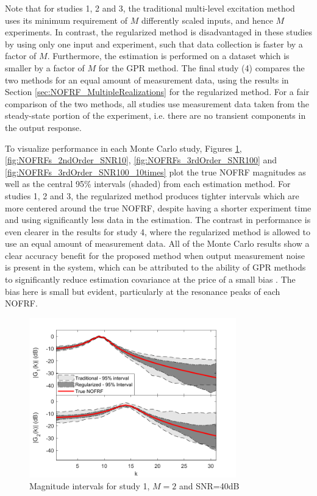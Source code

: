Note that for studies 1, 2 and 3, the traditional multi-level excitation method uses its minimum requirement of $M$ differently scaled inputs, and hence $M$ experiments. In contrast, the regularized method is disadvantaged in these studies by using only one input and experiment, such that data collection is faster by a factor of $M$. Furthermore, the estimation is performed on a dataset which is smaller by a factor of $M$ for the GPR method. The final study (4) compares the two methods for an equal amount of measurement data, using the results in Section \ref{sec:NOFRF_MultipleRealizations} for the regularized method. For a fair comparison of the two methods, all studies use measurement data taken from the steady-state portion of the experiment, i.e. there are no transient components in the output response. 

To visualize performance in each Monte Carlo study, Figures \ref{fig:NOFRFs_2ndOrder_SNR100}, \ref{fig:NOFRFs_2ndOrder_SNR10}, \ref{fig:NOFRFs_3rdOrder_SNR100} and \ref{fig:NOFRFs_3rdOrder_SNR100_10times} plot the true NOFRF magnitudes as well as the central 95\% intervals (shaded) from each estimation method. For studies 1, 2 and 3, the regularized method produces tighter intervals which are more centered around the true NOFRF, despite having a shorter experiment time and using significantly less data in the estimation. The contrast in performance is even clearer in the results for study 4, where the regularized method is allowed to use an equal amount of measurement data. All of the Monte Carlo results show a clear accuracy benefit for the proposed method when output measurement noise is present in the system, which can be attributed to the ability of GPR methods to significantly reduce estimation covariance at the price of a small bias \citep{Pillonetto2014}. The bias here is small but evident, particularly at the resonance peaks of each NOFRF.

\begin{figure}[!hp]
\centering
\includegraphics[width=0.8\textwidth]{Chapter7_NOFRFs/Hamm2ndOrder_SNR100_N128_DiscreteTime.pdf}
\caption{Magnitude intervals for study 1, $M=2$ and SNR=40dB}
\label{fig:NOFRFs_2ndOrder_SNR100}
\end{figure}

